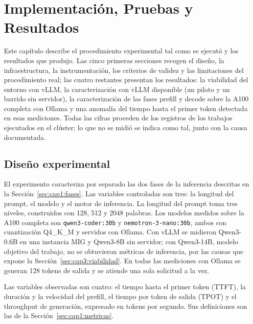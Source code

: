\chapter{Implementación, Pruebas y Resultados}
\label{chap:implementacion}

Este capítulo describe el procedimiento experimental tal como se ejecutó y los resultados que produjo. Las cinco primeras secciones recogen el diseño, la infraestructura, la instrumentación, los criterios de validez y las limitaciones del procedimiento real; las cuatro restantes presentan los resultados: la viabilidad del entorno con vLLM, la caracterización con vLLM disponible (un piloto y un barrido sin servidor), la caracterización de las fases prefill y decode sobre la A100 completa con Ollama y una anomalía del tiempo hasta el primer token detectada en esas mediciones. Todas las cifras proceden de los registros de los trabajos ejecutados en el clúster; lo que no se midió se indica como tal, junto con la causa documentada.


\section{Diseño experimental}
\label{sec:cap3:diseno}

El experimento caracteriza por separado las dos fases de la inferencia descritas en la Sección~\ref{sec:cap1:fases}. Las variables controladas son tres: la longitud del prompt, el modelo y el motor de inferencia. La longitud del prompt toma tres niveles, construidos con 128, 512 y 2048 palabras. Los modelos medidos sobre la A100 completa son \texttt{qwen3-\allowbreak coder:\allowbreak 30b} y \texttt{nemotron-3-\allowbreak nano:\allowbreak 30b}, ambos con cuantización Q4\_K\_M y servidos con Ollama. Con vLLM se midieron Qwen3-0.6B en una instancia MIG y Qwen3-8B sin servidor; con Qwen3-14B, modelo objetivo del trabajo, no se obtuvieron métricas de inferencia, por las causas que expone la Sección~\ref{sec:cap3:viabilidad}. En todas las mediciones con Ollama se generan 128 tokens de salida y se atiende una sola solicitud a la vez.

Las variables observadas son cuatro: el tiempo hasta el primer token (TTFT), la duración y la velocidad del prefill, el tiempo por token de salida (TPOT) y el throughput de generación, expresado en tokens por segundo. Sus definiciones son las de la Sección~\ref{sec:cap1:metricas}.

